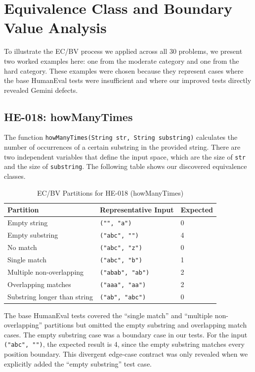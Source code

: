 \documentclass[journal]{IEEEtran}
\begin{document}
\section{Equivalence Class and Boundary Value Analysis}
\label{sec:ec-bv-tables}

To illustrate the EC/BV process we applied across all 30 problems, we present two worked examples here: one from the moderate category and one from the hard category. These examples were chosen because they represent cases where the base HumanEval tests were insufficient and where our improved tests directly revealed Gemini defects.

\subsection{HE-018: howManyTimes}
The function \texttt{howManyTimes(String str, String substring)} calculates the number of occurrences of a certain substring in the provided string. There are two independent variables that define the input space, which are the size of \texttt{str} and the size of \texttt{substring}. The following table shows our discovered equivalence classes.

\begin{table}[h]
\centering
\caption{EC/BV Partitions for HE-018 (howManyTimes)}
\label{tab:ec-018}
\begin{tabular}{lll}
\toprule
Partition & Representative Input & Expected \\
\midrule
Empty string           & \texttt{("", "a")}      & 0 \\
Empty substring        & \texttt{("abc", "")}    & 4 \\
No match               & \texttt{("abc", "z")}   & 0 \\
Single match           & \texttt{("abc", "b")}   & 1 \\
Multiple non-overlapping & \texttt{("abab", "ab")} & 2 \\
Overlapping matches    & \texttt{("aaa", "aa")}  & 2 \\
Substring longer than string & \texttt{("ab", "abc")} & 0 \\
\bottomrule
\end{tabular}
\end{table}

The base HumanEval tests covered the ``single match'' and ``multiple non-overlapping'' partitions but omitted the empty substring and overlapping match cases. The empty substring case was a boundary case in our tests. For the input \texttt{("abc", "")}, the expected result is 4, since the empty substring matches every position boundary. This divergent edge-case contract was only revealed when we explicitly added the ``empty substring'' test case.
\end{document}
